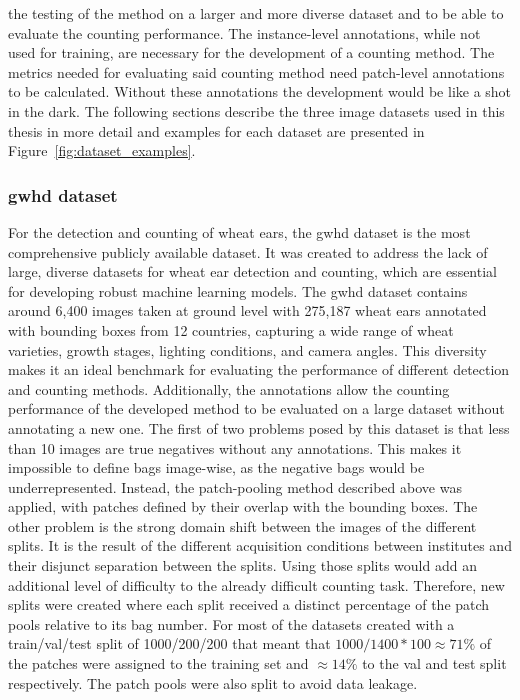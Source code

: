\documentclass[12pt,parskip = half, DIV=classic,listof=totoc]{scrartcl}
\begin{document}
			the testing of the method on a larger and more diverse dataset
			and to be able to evaluate the counting performance. The instance-level annotations, while not used for training, are necessary for the development 
			of a counting method. The metrics needed for evaluating said counting method need patch-level annotations to be calculated. Without these
			annotations the development would be like a shot in the dark. The following sections describe the three image datasets used in this thesis in more detail and examples for each dataset
			are presented in Figure~\ref{fig:dataset_examples}.
			

			\subsubsection{\acs*{gwhd} dataset}
				For the detection and counting of wheat ears, the \acf{gwhd} dataset 
				\cite{davidGlobalWheatHead2021} is the most comprehensive publicly available dataset. 
				It was created to address the lack of large, diverse datasets for wheat ear detection and counting, which are essential 
				for developing robust machine learning models. The \ac{gwhd} dataset contains around 6,400 images taken at ground level with 275,187 wheat ears annotated with bounding 
				boxes from 12 countries, capturing a wide range of wheat varieties, growth stages, lighting conditions, and camera angles. 
				This diversity makes it an ideal benchmark for evaluating the performance of different detection and counting methods. 
				Additionally, the annotations allow the counting performance of the developed method to be evaluated on a large dataset without annotating a new one.
				The first of two problems posed by this dataset is that
				less than 10 images are true negatives without any annotations. This makes it impossible to define bags image-wise, as the negative bags would be underrepresented.
				Instead, the patch-pooling method described above was applied, with patches defined by their overlap with the bounding boxes. The other problem is the 
				strong domain shift between the images of the different splits. It is the result of the different acquisition conditions between institutes and their disjunct separation between the splits.
				Using those splits would add an additional level of difficulty to the already difficult counting 
				task. Therefore, new splits were created where each split received a distinct percentage of the patch pools relative to its bag number. For most of the datasets created with a 
				train/val/test split of 1000/200/200 that meant that $1000/1400*100\approx71\%$ of the patches were assigned to the training set and $\approx14\%$ to the val and test split respectively. 
				The patch pools were also split to avoid data leakage.
					
\end{document}
